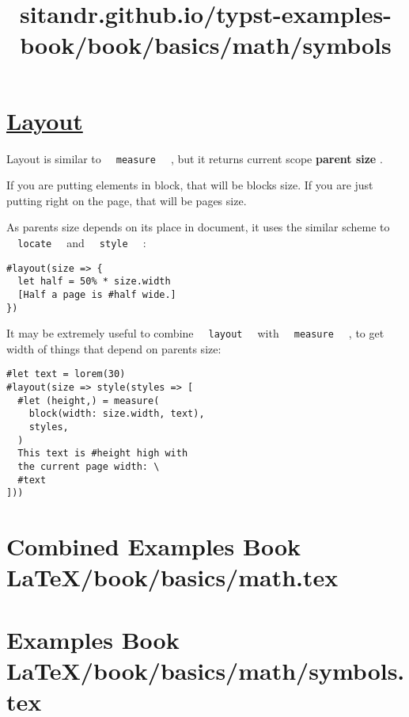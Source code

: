 \pandocbounded{}

\section{\texorpdfstring{\hyperref[layout]{Layout}}{Layout}}\label{layout}

Layout is similar to \texttt{\ }{\texttt{\ measure\ }}\texttt{\ } , but
it returns current scope \textbf{parent size} .

If you are putting elements in block, that will be
block\textquotesingle s size. If you are just putting right on the page,
that will be page\textquotesingle s size.

As parent\textquotesingle s size depends on it\textquotesingle s place
in document, it uses the similar scheme to
\texttt{\ }{\texttt{\ locate\ }}\texttt{\ } and
\texttt{\ }{\texttt{\ style\ }}\texttt{\ } :

\begin{verbatim}
#layout(size => {
  let half = 50% * size.width
  [Half a page is #half wide.]
})
\end{verbatim}

\pandocbounded{}

It may be extremely useful to combine
\texttt{\ }{\texttt{\ layout\ }}\texttt{\ } with
\texttt{\ }{\texttt{\ measure\ }}\texttt{\ } , to get width of things
that depend on parent\textquotesingle s size:

\begin{verbatim}
#let text = lorem(30)
#layout(size => style(styles => [
  #let (height,) = measure(
    block(width: size.width, text),
    styles,
  )
  This text is #height high with
  the current page width: \
  #text
]))
\end{verbatim}

\pandocbounded{}




\section{Combined Examples Book LaTeX/book/basics/math.tex}
\section{Examples Book LaTeX/book/basics/math/symbols.tex}
\title{sitandr.github.io/typst-examples-book/book/basics/math/symbols}

